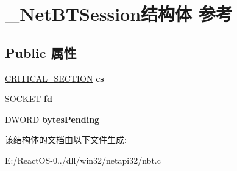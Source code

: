 \hypertarget{struct___net_b_t_session}{}\section{\+\_\+\+Net\+B\+T\+Session结构体 参考}
\label{struct___net_b_t_session}
\subsection*{Public 属性}
\begin{DoxyCompactItemize}
\item 
\mbox{\label{struct___net_b_t_session_a96bd3fbc0a3dec2871c73903ce824355}} 
\hyperlink{struct___c_r_i_t_i_c_a_l___s_e_c_t_i_o_n}{C\+R\+I\+T\+I\+C\+A\+L\+\_\+\+S\+E\+C\+T\+I\+ON} {\bfseries cs}
\item 
\mbox{\label{struct___net_b_t_session_a5000e34c3f84918197b62690a7e3b09e}} 
S\+O\+C\+K\+ET {\bfseries fd}
\item 
\mbox{\label{struct___net_b_t_session_aaf3c42dfa3ca6f9eca5c5d1c021a0a6a}} 
D\+W\+O\+RD {\bfseries bytes\+Pending}
\end{DoxyCompactItemize}


该结构体的文档由以下文件生成\+:\begin{DoxyCompactItemize}
\item 
E\+:/\+React\+O\+S-\/0../dll/win32/netapi32/nbt.\+c\end{DoxyCompactItemize}
